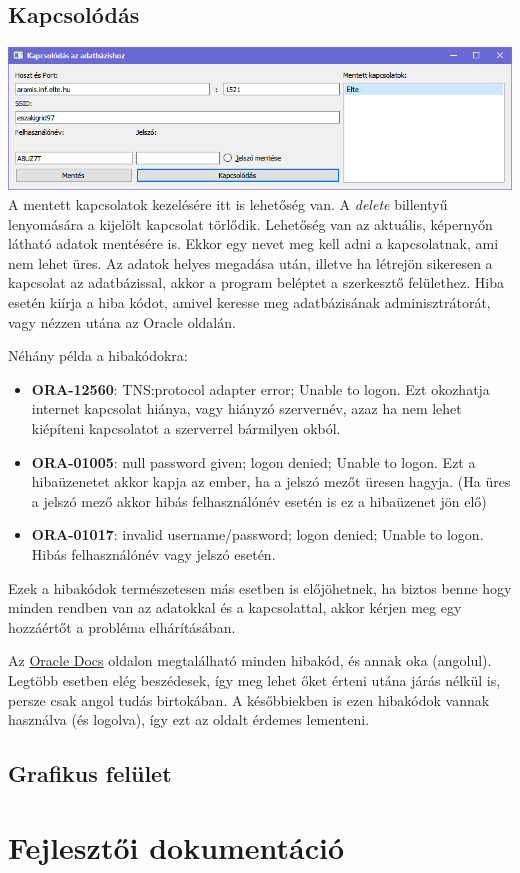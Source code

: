 \documentclass{elteikthesis}
\begin{document}
\section{Kapcsolódás}
\includegraphics[width=1.0\textwidth]{Connect}
A mentett kapcsolatok kezelésére itt is lehetőség van. A \textit{delete} billentyű lenyomására a kijelölt kapcsolat törlődik.
Lehetőség van az aktuális, képernyőn látható adatok mentésére is. Ekkor egy nevet meg kell adni a kapcsolatnak, ami nem lehet üres.
Az adatok helyes megadása után, illetve ha létrejön sikeresen a kapcsolat az adatbázissal, akkor a program beléptet a szerkesztő felülethez.
Hiba esetén kiírja a hiba kódot, amivel keresse meg adatbázisának adminisztrátorát, vagy nézzen utána az Oracle oldalán.

Néhány példa a hibakódokra:
\begin{itemize}
  \item \textbf{ORA-12560}: TNS:protocol adapter error; Unable to logon. Ezt okozhatja internet kapcsolat hiánya,
  vagy hiányzó szervernév, azaz ha nem lehet kiépíteni kapcsolatot a szerverrel bármilyen okból.
  \item \textbf{ORA-01005}: null password given; logon denied; Unable to logon. Ezt a hibaüzenetet akkor kapja az ember,
  ha a jelszó mezőt üresen hagyja. (Ha üres a jelszó mező akkor hibás felhasználónév esetén is ez a hibaüzenet jön elő)
  \item \textbf{ORA-01017}: invalid username/password; logon denied; Unable to logon. Hibás felhasználónév vagy jelszó esetén.
\end{itemize}

Ezek a hibakódok természetesen más esetben is előjöhetnek, ha biztos benne hogy minden rendben van az adatokkal és a
kapcsolattal, akkor kérjen meg egy hozzáértőt a probléma elhárításában.

Az \href{https://docs.oracle.com/cd/B28359_01/server.111/b28278/toc.htm}{Oracle Docs} oldalon megtalálható minden hibakód, és annak oka (angolul). Legtöbb esetben elég beszédesek, így meg lehet őket érteni utána járás nélkül is,
persze csak angol tudás birtokában. A későbbiekben is ezen hibakódok vannak használva (és logolva), így ezt az oldalt érdemes lementeni.

\section{Grafikus felület}

\chapter{Fejlesztői dokumentáció}
\end{document}
